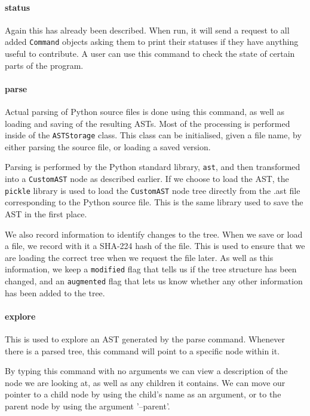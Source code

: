 \documentclass[twoside,a4paper]{report}
\begin{document}
\paragraph{status}

Again this has already been described. When run, it will send a request to all added \texttt{Command} objects asking them to print
their statuses if they have anything useful to contribute. A user can use this command to check the state of certain parts of the
program.

\paragraph{parse}

Actual parsing of Python source files is done using this command, as well as loading and saving of the resulting ASTs. Most of the processing
is performed inside of the \texttt{ASTStorage} class. This class can be initialised, given a file name, by either parsing the source file, or
loading a saved version.

Parsing is performed by the Python standard library, \texttt{ast}, and then transformed into a \texttt{CustomAST} node as described earlier.
If we choose to load the AST, the \texttt{pickle} library is used to load the \texttt{CustomAST} node tree directly from the .ast file
corresponding to the Python source file. This is the same library used to save the AST in the first place.

We also record information to identify changes to the tree. When we save or load a file, we record with it a SHA-224 hash of the file. This
is used to ensure that we are loading the correct tree when we request the file later. As well as this information, we keep a \texttt{modified}
flag that tells us if the tree structure has been changed, and an \texttt{augmented} flag that lets us know whether any other information has
been added to the tree.

\paragraph{explore}

This is used to explore an AST generated by the parse command. Whenever there is a parsed tree, this command will point to a specific node within it.

By typing this command with no arguments we can view a description of the node we are looking at, as well as any children it contains. We can move
our pointer to a child node by using the child's name as an argument, or to the parent node by using the argument '--parent'.
\end{document}
